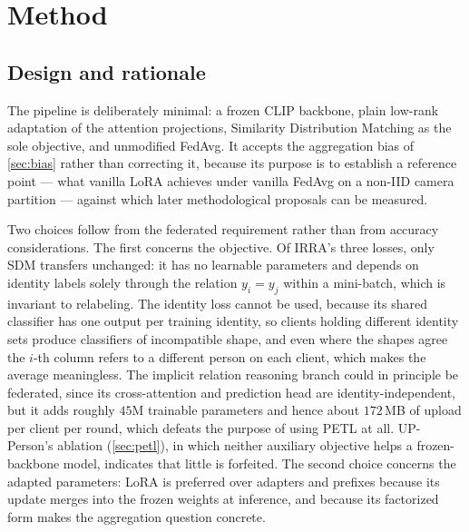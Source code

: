 \section{Method}\label{sec:method}

\subsection{Design and rationale}

The pipeline is deliberately minimal: a frozen CLIP backbone, plain low-rank adaptation of the attention projections, Similarity Distribution Matching as the sole objective, and unmodified FedAvg. It accepts the aggregation bias of \cref{sec:bias} rather than correcting it, because its purpose is to establish a reference point --- what vanilla LoRA achieves under vanilla FedAvg on a non-IID camera partition --- against which later methodological proposals can be measured.

Two choices follow from the federated requirement rather than from accuracy considerations. The first concerns the objective. Of IRRA's three losses, only SDM transfers unchanged: it has no learnable parameters and depends on identity labels solely through the relation $y_{i}=y_{j}$ within a mini-batch, which is invariant to relabeling. The identity loss cannot be used, because its shared classifier has one output per training identity, so clients holding different identity sets produce classifiers of incompatible shape, and even where the shapes agree the $i$-th column refers to a different person on each client, which makes the average meaningless. The implicit relation reasoning branch could in principle be federated, since its cross-attention and prediction head are identity-independent, but it adds roughly $45$M trainable parameters and hence about $172$\,MB of upload per client per round, which defeats the purpose of using PETL at all. UP-Person's ablation (\cref{sec:petl}), in which neither auxiliary objective helps a frozen-backbone model, indicates that little is forfeited. The second choice concerns the adapted parameters: LoRA is preferred over adapters and prefixes because its update merges into the frozen weights at inference, and because its factorized form makes the aggregation question concrete.

